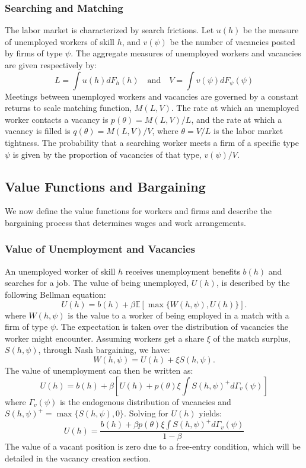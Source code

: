\documentclass[
  11pt,
  letterpaper,
  DIV=11,
  numbers=noendperiod]{scrartcl}
\begin{document}
\subsubsection{Searching and Matching}\label{searching-and-matching}

The labor market is characterized by search frictions. Let \(u(h)\) be
the measure of unemployed workers of skill \(h\), and \(v(\psi)\) be the
number of vacancies posted by firms of type \(\psi\). The aggregate
measures of unemployed workers and vacancies are given respectively by:
\[L = \int u(h) dF_h(h) \quad  \text{and} \quad V = \int v(\psi) dF_\psi(\psi)\]
Meetings between unemployed workers and vacancies are governed by a
constant returns to scale matching function, \(M(L, V)\). The rate at
which an unemployed worker contacts a vacancy is
\(p(\theta) = M(L,V)/L\), and the rate at which a vacancy is filled is
\(q(\theta) = M(L,V)/V\), where \(\theta = V/L\) is the labor market
tightness. The probability that a searching worker meets a firm of a
specific type \(\psi\) is given by the proportion of vacancies of that
type, \(v(\psi)/V\).

\subsection{Value Functions and
Bargaining}\label{value-functions-and-bargaining}

We now define the value functions for workers and firms and describe the
bargaining process that determines wages and work arrangements.

\subsubsection{Value of Unemployment and
Vacancies}\label{value-of-unemployment-and-vacancies}

An unemployed worker of skill \(h\) receives unemployment benefits
\(b(h)\) and searches for a job. The value of being unemployed,
\(U(h)\), is described by the following Bellman equation:
\[U(h) = b(h) + \beta \mathbb{E} \left[ \max\{W(h, \psi), U(h)\} \right].\]
where \(W(h, \psi)\) is the value to a worker of being employed in a
match with a firm of type \(\psi\). The expectation is taken over the
distribution of vacancies the worker might encounter. Assuming workers
get a share \(\xi\) of the match surplus, \(S(h, \psi)\), through Nash
bargaining, we have: \[W(h, \psi) = U(h) + \xi S(h, \psi).\]The value of
unemployment can then be written as:
\[U(h) = b(h) + \beta \left[ U(h) + p(\theta) \xi \int S(h, \psi)^+ d\Gamma_v(\psi) \right]\]
where \(\Gamma_v(\psi)\) is the endogenous distribution of vacancies and
\(S(h, \psi)^+ = \max\{S(h, \psi), 0\}\). Solving for \(U(h)\) yields:
\[U(h) = \frac{b(h) + \beta p(\theta) \xi \int S(h, \psi)^+ d\Gamma_v(\psi)}{1 - \beta}\]
The value of a vacant position is zero due to a free-entry condition,
which will be detailed in the vacancy creation section.
\end{document}
